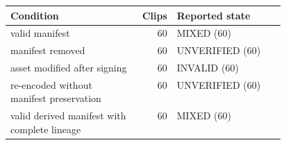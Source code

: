 \begin{tabular}{p{0.46\linewidth}rl}
\toprule
Condition & Clips & Reported state \\
\midrule
valid manifest & 60 & MIXED (60) \\
manifest removed & 60 & UNVERIFIED (60) \\
asset modified after signing & 60 & INVALID (60) \\
re-encoded without manifest preservation & 60 & UNVERIFIED (60) \\
valid derived manifest with complete lineage & 60 & MIXED (60) \\
\bottomrule
\end{tabular}

